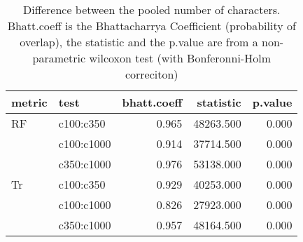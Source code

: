 \begin{table}[ht]
\centering
\begin{tabular}{llr|rr}
  \hline
metric & test & bhatt.coeff & statistic & p.value \\ 
  \hline
RF & c100:c350 & 0.965 & 48263.500 & 0.000 \\ 
   & c100:c1000 & 0.914 & 37714.500 & 0.000 \\ 
   & c350:c1000 & 0.976 & 53138.000 & 0.000 \\ 
  Tr & c100:c350 & 0.929 & 40253.000 & 0.000 \\ 
   & c100:c1000 & 0.826 & 27923.000 & 0.000 \\ 
   & c350:c1000 & 0.957 & 48164.500 & 0.000 \\ 
   \hline
\end{tabular}
\caption{Difference between the pooled number of characters. Bhatt.coeff is the Bhattacharrya Coefficient (probability of overlap), the statistic and the p.value are from a non-parametric wilcoxon test (with Bonferonni-Holm correciton)} 
\label{Tab_pooledscharacters_test}
\end{table}
